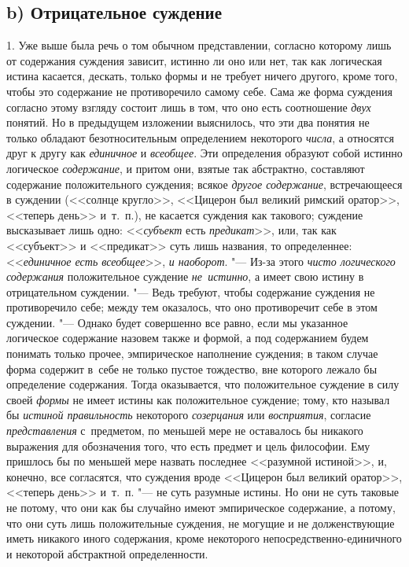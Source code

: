 \subsection[b) Отрицательное суждение]{b) Отрицательное суждение}
1. Уже выше была речь о том обычном представлении, согласно
которому лишь от содержания суждения зависит, истинно ли оно или нет, так
как логическая истина касается, дескать, только формы и не требует ничего
другого, кроме того, чтобы это содержание не противоречило самому себе.
Сама же форма суждения согласно этому взгляду состоит лишь в том, что оно
есть соотношение {\em двух} понятий. Но в предыдущем изложении выяснилось, что
эти два понятия не только обладают безотносительным определением некоторого
{\em числа}, а относятся друг к другу как {\em единичное} и {\em всеобщее}.
Эти определения образуют собой истинно логическое {\em содержание}, и притом
они, взятые так абстрактно, составляют содержание положительного суждения;
всякое {\em другое содержание}, встречающееся в суждении (<<солнце кругло>>,
<<Цицерон был великий римский оратор>>, <<теперь день>> и~т.~п.), не касается
суждения как такового; суждение высказывает лишь одно: <<{\em субъект} есть
{\em предикат}>>, или, так как <<субъект>> и <<предикат>> суть лишь названия,
то определеннее: <<{\em единичное есть всеобщее}>>, {\em и наоборот}. "---
Из-за этого {\em чисто логического содержания} положительное суждение
{\em не~истинно}, а имеет свою истину в отрицательном суждении. "--- Ведь
требуют, чтобы содержание суждения не противоречило себе; между тем оказалось,
что оно противоречит себе в этом суждении. "--- Однако будет совершенно
все равно, если мы указанное логическое содержание назовем также и формой,
а под содержанием будем понимать только прочее, эмпирическое наполнение
суждения; в таком случае форма содержит в~себе не только пустое тождество,
вне которого лежало бы определение содержания. Тогда оказывается, что
положительное суждение в силу своей {\em формы} не имеет
истины как положительное суждение; тому, кто называл бы
{\em истиной правильность} некоторого {\em созерцания} или
{\em восприятия}, согласие {\em представления} с~предметом,
по меньшей мере не оставалось бы никакого выражения для
обозначения того, что есть предмет и цель философии. Ему пришлось бы по
меньшей мере назвать последнее <<разумной истиной>>, и, конечно, все
согласятся, что суждения вроде <<Цицерон был великий оратор>>, <<теперь день>>
и~т.~п. "--- не суть разумные истины. Но они не суть таковые не
потому, что они как бы случайно имеют эмпирическое содержание, а потому,
что они суть лишь положительные суждения, не могущие и не долженствующие
иметь никакого иного содержания, кроме некоторого
непосредственно-единичного и некоторой абстрактной определенности.

